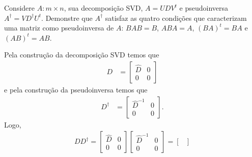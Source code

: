 % 
% 
% 
% 
%
% 
%
%
\begin{questions}
    \question Considere $A : m \times n$, sua decomposi\c{c}\~{a}o SVD, $A = U D V^t$ e pseudoinversa $A^\dagger = V D^\dagger U^t$. Demonstre que $A^\dagger$ satisfaz as quatro condi\c{c}\~{o}es que caracterizam uma matriz como pseudoinversa de $A$: $B A B = B$, $A B A = A$, $(B A)^t = BA$ e $(A B)^t = A B$.
    \begin{solution}
        Pela constru\c{c}\~{a}o da decomposi\c{c}\~{a}o SVD temos que
        \begin{align*}
            D &= \begin{bmatrix}
                \hat{D} & 0 \\
                0 & 0
            \end{bmatrix}
        \end{align*}
        e pela constru\c{c}\~{a}o da pseudoinversa temos que
        \begin{align*}
            D^\dagger &= \begin{bmatrix}
                \hat{D}^{-1} & 0 \\
                0 & 0
            \end{bmatrix}.
        \end{align*}
        Logo,
        \begin{align*}
            D D^\dagger = \begin{bmatrix}
                \hat{D} & 0 \\
                0 & 0
            \end{bmatrix} \begin{bmatrix}
                \hat{D}^{-1} & 0 \\
                0 & 0
            \end{bmatrix} = \begin{bmatrix}

\end{bmatrix}
\end{align*}
\end{solution}
\end{questions}
